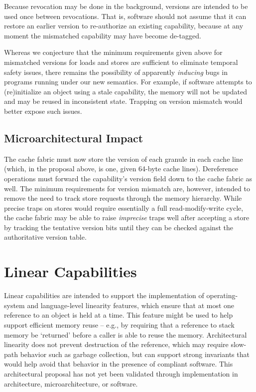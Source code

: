 Because revocation may be done in the background, versions are intended to
be used once between revocations. That is, software should not assume that
it can restore an earlier version to re-authorize an existing capability,
because at any moment the mismatched capability may have become de-tagged.

Whereas we conjecture that the minimum requirements given above for mismatched
versions for loads and stores are sufficient to eliminate temporal safety
issues, there remains the possibility of apparently \emph{inducing} bugs in
programs running under our new semantics.  For example, if software attempts
to (re)initialize an object using a stale capability, the memory will not be
updated and may be reused in inconsistent state.  Trapping on version
mismatch would better expose such issues.

\subsection{Microarchitectural Impact} %

The cache fabric must now store the version of each granule in each cache line
(which, in the proposal above, is one, given 64-byte cache lines).
Dereference operations must forward the capability's version field down to
the cache fabric as well.  The minimum requirements for version mismatch
are, however, intended to remove the need to track store requests through
the memory hierarchy.  While precise traps on stores would require
essentially a full read-modify-write cycle, the cache fabric may be able to
raise \emph{imprecise} traps well after accepting a store by tracking the
tentative version bits until they can be checked against the authoritative version
table.

\section{Linear Capabilities} %
\label{section:linear-capabilities}

Linear capabilities are intended to support the implementation of
operating-system and language-level linearity features, which ensure that at
most one reference to an object is held at a time.
This feature might be used to help support efficient memory reuse -- e.g., by
requiring that a reference to stack memory be `returned' before a caller is
able to reuse the memory.
Architectural linearity does not prevent destruction of the reference, which
may require slow-path behavior such as garbage collection, but can support
strong invariants that would help avoid that behavior in the presence of
compliant software.
This architectural proposal has not yet been validated through
implementation in architecture, microarchitecture, or software.

